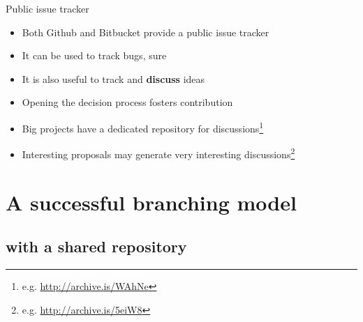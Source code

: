 \documentclass[presentation]{beamer}
\begin{document}
\begin{frame}{Public issue tracker}
    \begin{itemize}
        \item Both Github and Bitbucket provide a public issue tracker
        \item It can be used to track bugs, sure
        \item It is also useful to track and \textbf{discuss} ideas
        \item Opening the decision process fosters contribution
        \item Big projects have a dedicated repository for discussions\footnote{e.g. \url{http://archive.is/WAhNe}}
        \item Interesting proposals may generate very interesting discussions\footnote{e.g. \url{http://archive.is/5eiW8}}
    \end{itemize}
\end{frame}



\section{A successful branching model}

\subsection{with a shared repository}
\end{document}
